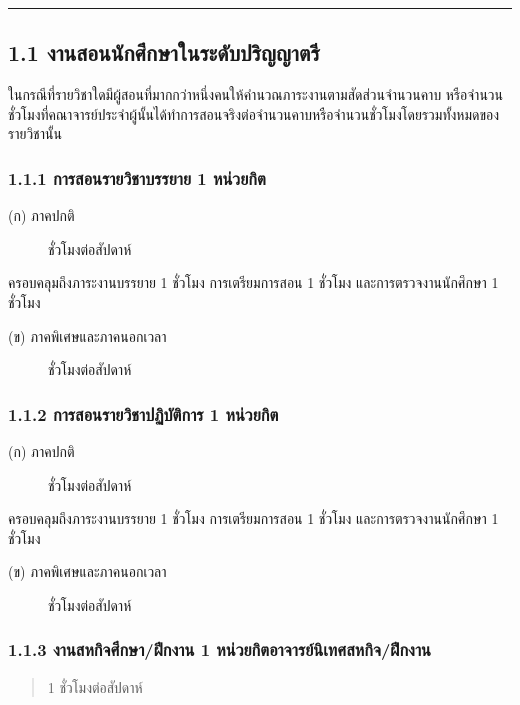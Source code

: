 \documentclass[a4paper,12pt,english]{sphinxmanual}
\begin{document}
\bigskip\hrule\bigskip



\subsection{1.1 งานสอนนักศึกษาในระดับปริญญาตรี}
\label{\detokenize{workload_rubric:id3}}
ในกรณีที่รายวิชาใดมีผู้สอนที่มากกว่าหนึ่งคนให้คำนวณภาระงานตามสัดส่วนจำนวนคาบ หรือจำนวนชั่วโมงที่คณาจารย์ประจำผู้นั้นได้ทำการสอนจริงต่อจำนวนคาบหรือจำนวนชั่วโมงโดยรวมทั้งหมดของรายวิชานั้น


\subsubsection{1.1.1 การสอนรายวิชาบรรยาย 1 หน่วยกิต}
\label{\detokenize{workload_rubric:id4}}\begin{description}
\item[{(ก) ภาคปกติ}]  ชั่วโมงต่อสัปดาห์

\end{description}

ครอบคลุมถึงภาระงานบรรยาย 1 ชั่วโมง การเตรียมการสอน 1 ชั่วโมง และการตรวจงานนักศึกษา 1 ชั่วโมง
\begin{description}
\item[{(ข) ภาคพิเศษและภาคนอกเวลา}]  ชั่วโมงต่อสัปดาห์

\end{description}


\subsubsection{1.1.2 การสอนรายวิชาปฏิบัติการ 1 หน่วยกิต}
\label{\detokenize{workload_rubric:id5}}\begin{description}
\item[{(ก) ภาคปกติ}]  ชั่วโมงต่อสัปดาห์

\end{description}

ครอบคลุมถึงภาระงานบรรยาย 1 ชั่วโมง การเตรียมการสอน 1 ชั่วโมง และการตรวจงานนักศึกษา 1 ชั่วโมง
\begin{description}
\item[{(ข) ภาคพิเศษและภาคนอกเวลา}]  ชั่วโมงต่อสัปดาห์

\end{description}


\subsubsection{1.1.3 งานสหกิจศึกษา/ฝึกงาน 1 หน่วยกิตอาจารย์นิเทศสหกิจ/ฝึกงาน}
\label{\detokenize{workload_rubric:id6}}\begin{quote}

1 ชั่วโมงต่อสัปดาห์
\end{quote}
\end{document}
